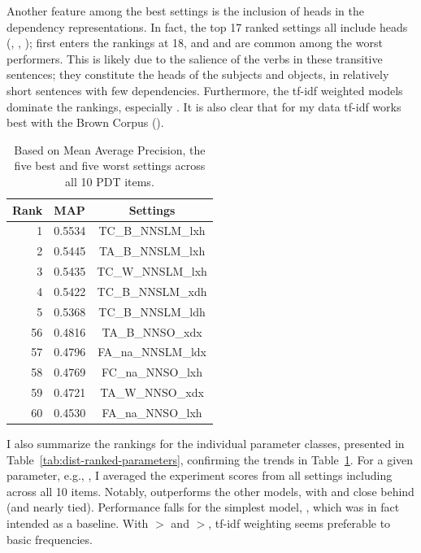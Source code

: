 Another feature among the best settings is the inclusion of heads in the dependency representations. In fact, the top 17 ranked settings all include heads (, , );  first enters the rankings at 18, and  and  are common among the worst performers. This is likely due to the salience of the verbs in these transitive sentences; they constitute the heads of the subjects and objects, in relatively short sentences with few dependencies.
Furthermore, the tf-idf weighted models dominate the rankings, especially . It is also clear that for my data tf-idf works best with the Brown Corpus ().

\begin{table}[htb!]
\begin{center}
\begin{tabular}{|r|l|c|}
\hline
Rank & MAP & Settings \\
\hline
\hline
1 & 0.5534 & TC\_B\_NNSLM\_lxh \\
\hline
2 & 0.5445 & TA\_B\_NNSLM\_lxh \\
\hline
3 & 0.5435 & TC\_W\_NNSLM\_lxh \\
\hline
4 & 0.5422 & TC\_B\_NNSLM\_xdh \\
\hline
5 & 0.5368 & TC\_B\_NNSLM\_ldh \\
\hline
\hline
56 & 0.4816 & TA\_B\_NNSO\_xdx \\
\hline
57 & 0.4796 & FA\_na\_NNSLM\_ldx \\
\hline
58 & 0.4769 & FC\_na\_NNSO\_lxh \\
\hline
59 & 0.4721 & TA\_W\_NNSO\_xdx \\
\hline
60 & 0.4530 & FA\_na\_NNSO\_lxh \\
\hline
\end{tabular}
\caption{Based on Mean Average Precision, the five best and five worst settings across all 10 PDT items.}
\label{tab:all-dist-ranked-settings}
\end{center}
\end{table}

I also summarize the rankings for the individual parameter classes,
presented in Table~\ref{tab:dist-ranked-parameters}, confirming the
trends in Table~\ref{tab:all-dist-ranked-settings}. For a given
parameter, e.g., , I averaged the experiment scores from
all settings including  across all 10 items. Notably,  outperforms the other models, with  and  close behind (and nearly tied). Performance falls for the simplest model, , which was in fact intended as a baseline. With $>$ and $>$, tf-idf weighting seems preferable to basic frequencies.

